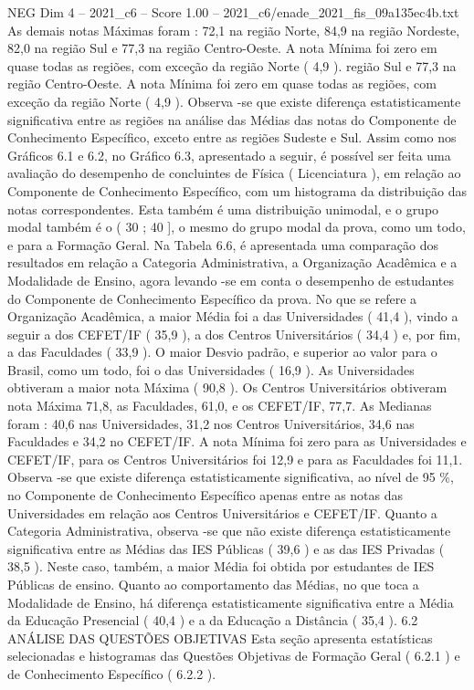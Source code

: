 \begin{textsample}{NEG Dim 4 – 2021\_c6 – Score 1.00 – 2021\_c6/enade\_2021\_fis\_09a135ec4b.txt}
As demais notas Máximas foram : 72,1 na região Norte, 84,9 na região Nordeste, 82,0 na região Sul e 77,3 na região Centro-Oeste.
A nota Mínima foi zero em quase todas as regiões, com exceção da região Norte ( 4,9 ). região Sul e 77,3 na região Centro-Oeste.
A nota Mínima foi zero em quase todas as regiões, com exceção da região Norte ( 4,9 ).
Observa -se que existe diferença estatisticamente significativa entre as regiões na análise das Médias das notas do Componente de Conhecimento Específico, exceto entre as regiões Sudeste e Sul.
Assim como nos Gráficos 6.1 e 6.2, no Gráfico 6.3, apresentado a seguir, é possível ser feita uma avaliação do desempenho de concluintes de Física ( Licenciatura ), em relação ao Componente de Conhecimento Específico, com um histograma da distribuição das notas correspondentes.
Esta também é uma distribuição unimodal, e o grupo modal também é o ( 30 ; 40 ], o mesmo do grupo modal da prova, como um todo, e para a Formação Geral.
Na Tabela 6.6, é apresentada uma comparação dos resultados em relação a Categoria Administrativa, a Organização Acadêmica e a Modalidade de Ensino, agora levando -se em conta o desempenho de estudantes do Componente de Conhecimento Específico da prova.
No que se refere a Organização Acadêmica, a maior Média foi a das Universidades ( 41,4 ), vindo a seguir a dos CEFET/IF ( 35,9 ), a dos Centros Universitários ( 34,4 ) e, por fim, a das Faculdades ( 33,9 ).
O maior Desvio padrão, e superior ao valor para o Brasil, como um todo, foi o das Universidades ( 16,9 ).
As Universidades obtiveram a maior nota Máxima ( 90,8 ).
Os Centros Universitários obtiveram nota Máxima 71,8, as Faculdades, 61,0, e os CEFET/IF, 77,7.
As Medianas foram : 40,6 nas Universidades, 31,2 nos Centros Universitários, 34,6 nas Faculdades e 34,2 no CEFET/IF.
A nota Mínima foi zero para as Universidades e CEFET/IF, para os Centros Universitários foi 12,9 e para as Faculdades foi 11,1.
Observa -se que existe diferença estatisticamente significativa, ao nível de 95 \%, no Componente de Conhecimento Específico apenas entre as notas das Universidades em relação aos Centros Universitários e CEFET/IF.
Quanto a Categoria Administrativa, observa -se que não existe diferença estatisticamente significativa entre as Médias das IES Públicas ( 39,6 ) e as das IES Privadas ( 38,5 ).
Neste caso, também, a maior Média foi obtida por estudantes de IES Públicas de ensino.
Quanto ao comportamento das Médias, no que toca a Modalidade de Ensino, há diferença estatisticamente significativa entre a Média da Educação Presencial ( 40,4 ) e a da Educação a Distância ( 35,4 ). 6.2 ANÁLISE DAS QUESTÕES OBJETIVAS Esta seção apresenta estatísticas selecionadas e histogramas das Questões Objetivas de Formação Geral ( 6.2.1 ) e de Conhecimento Específico ( 6.2.2 ).

\end{textsample}
